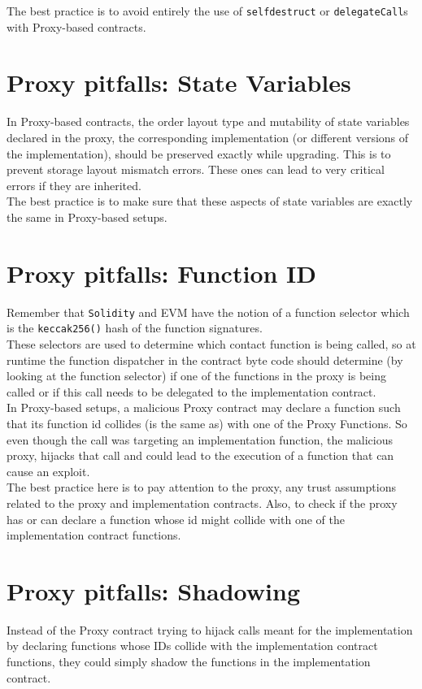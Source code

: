 The best practice is to avoid entirely the use of \texttt{selfdestruct} or \texttt{delegateCall}s with Proxy-based contracts.

\section{Proxy pitfalls: State Variables}
In Proxy-based contracts, the order layout type and mutability of state variables declared in the proxy, the corresponding implementation (or different versions of the implementation), should be preserved exactly while upgrading. This is to prevent storage layout mismatch errors. These ones can lead to very critical errors if they are inherited. \\

The best practice is to make sure that these aspects of state variables are exactly the same in Proxy-based setups.

\section{Proxy pitfalls: Function ID}
Remember that \texttt{Solidity} and EVM have the notion of a function selector which is the \texttt{keccak256()} hash of the function signatures. \\

These selectors are used to determine which contact function is being called, so at runtime the function dispatcher in the contract byte code should determine (by looking at the function selector) if one of the functions in the proxy is being called or if this call needs to be delegated to the implementation contract.\\

In Proxy-based setups, a malicious Proxy contract may declare a function such that its function id collides (is the same as) with one of the Proxy Functions. So even though the call was targeting an implementation function, the malicious proxy, hijacks that call and could lead to the execution of a function that can cause an exploit.\\

The best practice here is to pay attention to the proxy, any trust assumptions related to the proxy and implementation contracts. Also, to check if the proxy has or can declare a function whose id might collide with one of the implementation contract functions.

\section{Proxy pitfalls: Shadowing}
Instead of the Proxy contract trying to hijack calls meant for the implementation by declaring functions whose IDs collide with the implementation contract functions, they could simply shadow the functions in the implementation contract.\\

